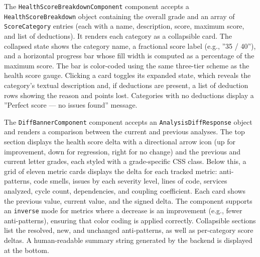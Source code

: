 \par The \texttt{HealthScoreBreakdownComponent} component accepts a \texttt{Hea\-lth\-Sco\-re\-Break\-down} object containing the overall grade and an array of \texttt{ScoreCategory} entries (each with a name, description, score, maximum score, and list of deductions). It renders each category as a collapsible card. The collapsed state shows the category name, a fractional score label (e.g., ''35 / 40''), and a horizontal progress bar whose fill width is computed as a percentage of the maximum score. The bar is color-coded using the same three-tier scheme as the health score gauge. Clicking a card toggles its expanded state, which reveals the category's textual description and, if deductions are present, a list of deduction rows showing the reason and points lost. Categories with no deductions display a ''Perfect score --- no issues found'' message.

\par The \texttt{DiffBannerComponent} component accepts an \texttt{Analysis\-Diff\-Response} object and renders a comparison between the current and previous analyses. The top section displays the health score delta with a directional arrow icon (up for improvement, down for regression, right for no change) and the previous and current letter grades, each styled with a grade-specific CSS class. Below this, a grid of eleven metric cards displays the delta for each tracked metric: anti-patterns, code smells, issues by each severity level, lines of code, services analyzed, cycle count, dependencies, and coupling coefficient. Each card shows the previous value, current value, and the signed delta. The component supports an \texttt{inverse} mode for metrics where a decrease is an improvement (e.g., fewer anti-patterns), ensuring that color coding is applied correctly. Collapsible sections list the resolved, new, and unchanged anti-patterns, as well as per-category score deltas. A human-readable summary string generated by the backend is displayed at the bottom.


